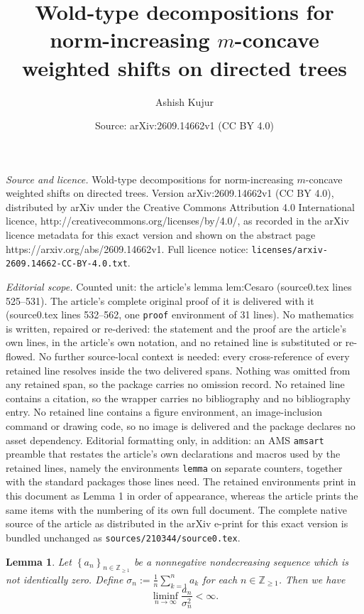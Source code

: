 \documentclass[10pt,a4paper]{amsart}
\title{Wold-type decompositions for norm-increasing $m$-concave weighted shifts on directed trees}
\author{Ashish Kujur}
\date{Source: arXiv:2609.14662v1 (CC BY 4.0)}
\newtheorem{lemma}{Lemma}
\newcommand{\Z}{\mathbb Z}
\renewcommand{\ge}{\geqslant}
\begin{document}
\maketitle

\noindent\emph{Source and licence.} Wold-type decompositions for norm-increasing $m$-concave weighted shifts on directed trees. Version arXiv:2609.14662v1 (CC BY 4.0), distributed by arXiv under the Creative Commons Attribution 4.0 International licence, http://creativecommons.org/licenses/by/4.0/, as recorded in the arXiv licence metadata for this exact version and shown on the abstract page https://arxiv.org/abs/2609.14662v1. Full licence notice: \texttt{licenses/arxiv-2609.14662-CC-BY-4.0.txt}.\par\smallskip

\noindent\textit{Editorial scope.} Counted unit: the article's lemma lem:Cesaro (source0.tex lines 525--531). The article's complete original proof of it is delivered with it (source0.tex lines 532--562, one \texttt{proof} environment of 31 lines). No mathematics is written, repaired or re-derived: the statement and the proof are the article's own lines, in the article's own notation, and no retained line is substituted or re-flowed.  No further source-local context is needed: every cross-reference of every retained line resolves inside the two delivered spans.  Nothing was omitted from any retained span, so the package carries no omission record.  No retained line contains a citation, so the wrapper carries no bibliography and no bibliography entry.  No retained line contains a figure environment, an image-inclusion command or drawing code, so no image is delivered and the package declares no asset dependency.  Editorial formatting only, in addition: an AMS \texttt{amsart} preamble that restates the article's own declarations and macros used by the retained lines, namely the environments \texttt{lemma} on separate counters, together with the standard packages those lines need.  The retained environments print in this document as Lemma 1 in order of appearance, whereas the article prints the same items with the numbering of its own full document.  The complete native source of the article as distributed in the arXiv e-print for this exact version is bundled unchanged as \texttt{sources/210344/source0.tex}.
\begin{lemma}
    Let $\left\{ a_n \right\}_{n \in \Z_{\ge 1}}$ be a nonnegative nondecreasing sequence which is not identically zero. Define $\sigma_n := \frac{1}{n} \sum_{k=1}^{n} a_k$ for each $n \in \Z_{\ge 1}$. Then we have
    \begin{equation*}
        \liminf_{n \to \infty} \frac{a_n}{\sigma_n ^{2}} < \infty.
    \end{equation*}
    \label{lem:Cesaro}
\end{lemma}
\end{document}
